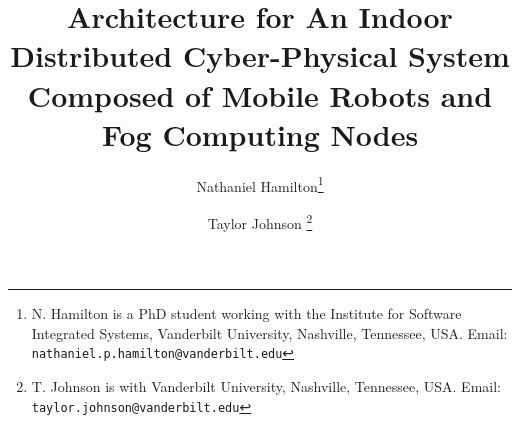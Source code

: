 \documentclass{IEEEtran}
\begin{document}
	
%
\title{Architecture for An Indoor Distributed Cyber-Physical System Composed of Mobile Robots and Fog Computing Nodes}


\author{
  Nathaniel Hamilton\thanks{N. Hamilton is a PhD student working with the Institute for Software Integrated Systems, Vanderbilt University, Nashville, Tennessee, USA. Email: {\tt\small nathaniel.p.hamilton@vanderbilt.edu}}\hspace{0.1in}
 \and
	Taylor Johnson \thanks{T. Johnson is with Vanderbilt University, Nashville, Tennessee, USA. Email:
{\tt\small taylor.johnson@vanderbilt.edu}}\hspace{0.1in}
}


\maketitle 


\IEEEpeerreviewmaketitle









\cite{OKa13}
\cite{Dey:2016:RSR:3004010.3004032}
\cite{7968650}





\end{document}
